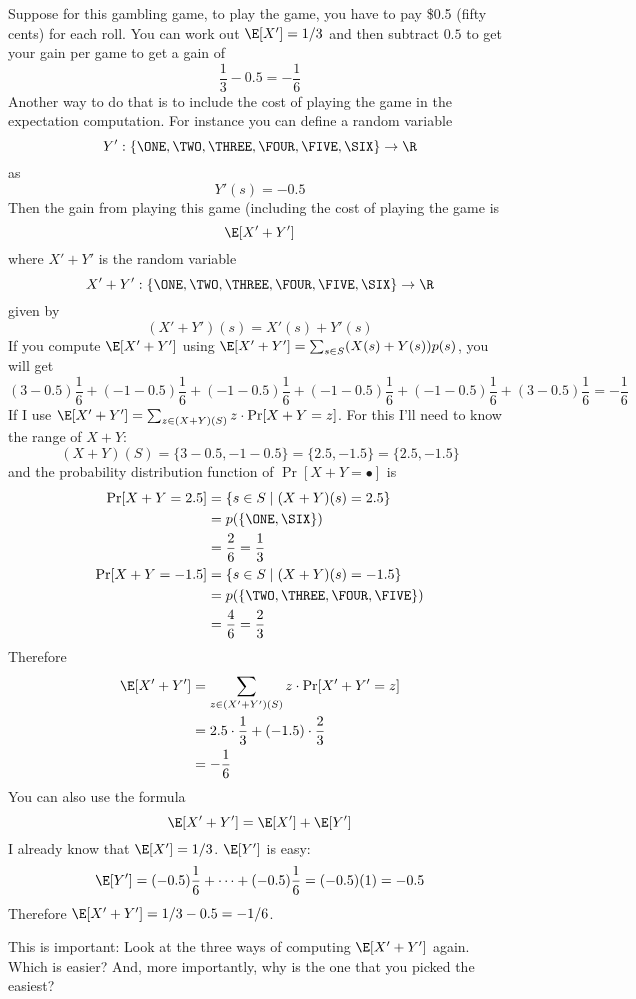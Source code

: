 Suppose for this gambling game, to play the game, you have to pay \$0.5 (fifty cents)
for each roll.
You can work out $\E[X'] = 1/3$ and then subtract $0.5$ to get your gain per game
to get a gain of
\[
  \frac{1}{3} - 0.5 = -\frac{1}{6}
\]
Another way to do that is to include the cost of playing the game in the expectation
computation.
For instance you can define a random variable
\[
  Y' : \{\ONE, \TWO, \THREE, \FOUR, \FIVE, \SIX \} \rightarrow \R 
\]
as
\[
  Y'(s) = -0.5
\]
Then the gain from playing this game (including the cost of playing the game is
\[
  \E[X' + Y']
\]
where $X' + Y'$ is the random variable
\[
  X' + Y': \{\ONE, \TWO, \THREE, \FOUR, \FIVE, \SIX\} \rightarrow \R
\]
given by
\[
  (X' + Y')(s) = X'(s) + Y'(s)
\]
If you compute $\E[X' + Y']$ using $\E[X' + Y'] = \sum_{s \in S} (X(s) + Y(s)) p(s)$, you will get
\[
  (3 - 0.5) \frac{1}{6}
  + (-1 - 0.5) \frac{1}{6}
  + (-1 - 0.5) \frac{1}{6}
  + (-1 - 0.5) \frac{1}{6}
  + (-1 - 0.5) \frac{1}{6}
  + (3 - 0.5) \frac{1}{6}
  = -\frac{1}{6}
\]
If I use $\E[X' + Y'] = \sum_{z \in (X+Y)(S)} z \cdot \Pr[X+Y=z]$.
For this I'll need to know the range of $X + Y$:
\[
  (X + Y)(S) = \{3 - 0.5, -1 - 0.5\} = \{2.5, -1.5\} = \{2.5, -1.5\}
\]
and the probability distribution function of $\Pr[X + Y = \bullet]$ is
\begin{align*}
  \Pr[X + Y = 2.5]
  &= \{s \in S \mid (X + Y)(s) = 2.5\} \\
  &= p(\{ \ONE, \SIX \}) \\
  &= \frac{2}{6} = \frac{1}{3}
  \\
  \Pr[X + Y = -1.5]
  &= \{s \in S \mid (X + Y)(s) = -1.5\} \\
  &= p(\{\TWO, \THREE, \FOUR, \FIVE\}) \\
  &= \frac{4}{6} = \frac{2}{3}
\end{align*}
Therefore
\begin{align*}
  \E[X' + Y']
  &= \sum_{z \in (X'+Y')(S)} z \cdot \Pr[X'+Y'=z] \\
  &= 2.5 \cdot \frac{1}{3} + (-1.5) \cdot \frac{2}{3} \\
  &= -\frac{1}{6} 
\end{align*}
You can also use the formula
\[
  \E[X' + Y'] = \E[X'] + \E[Y']
\]
I already know that $\E[X'] = 1/3$.
$\E[Y']$ is easy:
\[
  \E[Y'] = (-0.5) \frac{1}{6} + \cdots + (-0.5) \frac{1}{6} = (-0.5)(1) = -0.5 
\]
Therefore $\E[X' + Y'] = 1/3 - 0.5 = -1/6$.

This is important:
Look at the three ways of computing
$\E[X' + Y']$ again.
Which is easier?
And, more importantly, why is the one that you picked
the easiest?

